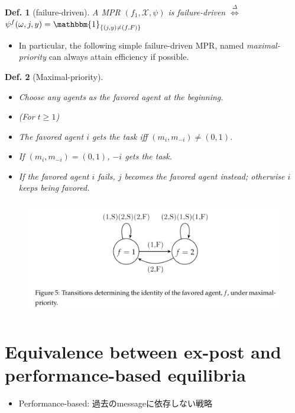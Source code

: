 \documentclass[11pt,a4paper,dvipdfmx]{article}
\newtheorem{df}{Def.}
\newcommand{\mX}{\mathcal{X}}
\newcommand{\defi}{\stackrel{\Delta}{\Longleftrightarrow}}
\newcommand{\1}{\mathbbm{1}}
\begin{document}
\begin{df}[failure-driven]
	A MPR $(f_1, \mX, \psi)$ is failure-driven $\defi$ $\psi^f(\omega, j, y) = \1_{\{(j,y) \neq (f, F)\}}$
\end{df}

\begin{itemize}
	\item In particular, the following simple failure-driven MPR, named \textit{maximal-priority} can always attain efficiency if possible.
\end{itemize}

\begin{df}[Maximal-priority]
	\begin{itemize}
		\item Choose any agents as the favored agent at the beginning.
		\item(For $t \geq 1$)
		\item The favored agent $i$ gets the task iff $(m_i, m_{-i}) \neq (0,1)$.
		\item If $(m_i, m_{-i}) = (0,1)$, $-i$ gets the task.
		\item If the favored agent $i$ fails, $j$ becomes the favored agent instead; otherwise $i$ keeps being favored.
	\end{itemize}
\end{df}

\begin{figure}[H]
  \centering
    \includegraphics[height=5cm]{image/trans.png}
\end{figure}

\section*{Equivalence between ex-post and performance-based equilibria}
\begin{itemize}
	\item Performance-based: 過去のmessageに依存しない戦略
\end{itemize}


\newpage
\end{document}
